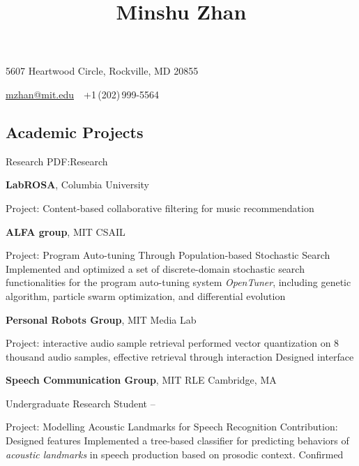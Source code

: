 \documentclass[a4paper,10pt,oneside]{article}
\begin{document}

\title{Minshu Zhan}

\begin{subtitle}
5607 Heartwood Circle, Rockville, MD 20855
\par
\href{mailto:mzhan@mit.edu}
{mzhan@mit.edu}
\,\BulletSymbol\,
+1\,(202)\,999-5564
\end{subtitle}

\begin{body}


\section
{Academic Projects}
{Research}
{PDF:Research}

\textbf{LabROSA}, Columbia University  \par
Project: Content-based collaborative filtering for music recommendation
\BulletItem 
\BulletItem
\BulletItem  

\textbf{ALFA group}, MIT CSAIL
\par Project: Program Auto-tuning Through Population-based Stochastic Search
\BulletItem
Implemented and optimized a set of discrete-domain stochastic search functionalities for the program auto-tuning system \emph{OpenTuner}, including genetic algorithm, particle swarm optimization, and differential evolution

\textbf{Personal Robots Group}, MIT Media Lab
\par Project: interactive audio sample retrieval  
\BulletItem performed vector quantization on 8 thousand audio samples, 
\BulletItem effective retrieval through interaction
\BulletItem Designed interface
 

\textbf{Speech Communication Group},
MIT RLE
\hfill Cambridge, MA
\par
Undergraduate Research Student
\hfill
{} --
\begin{detail}
\BulletItem
Project:
Modelling Acoustic Landmarks for Speech Recognition	
\BulletItem
Contribution:
Designed features 
Implemented a tree-based classifier for predicting behaviors of \emph{acoustic landmarks} in speech production based on prosodic context. 
Confirmed
 \end{detail}


\end{body}
\end{document}
